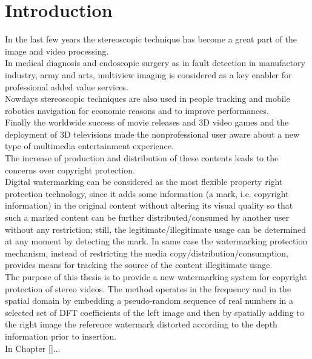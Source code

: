 \chapter*{Introduction}
\label{intro}
{}

In the last few years the stereoscopic technique has become a great part of the image and video processing.\\
In medical diagnosis and endoscopic surgery as in fault detection in manufactory industry, army and arts,
multiview imaging is considered as a key enabler  for professional added value services.\\
Nowdays stereoscopic techniques are also used in people tracking and mobile robotics
navigation for economic reasons and to improve performances.\\
Finally the worldwide success of movie releases and  3D video games and the deployment of 3D televisions made the nonprofessional user aware about a new type of multimedia entertainment experience.\\
The increase of production and distribution of these contents leads to the concerns over copyright protection.\\
Digital watermarking can be considered as the most flexible property right protection technology, since it adds some information (a mark, i.e. copyright information) in the
original content without altering its visual quality so that such a marked content can be further distributed/consumed by another user without any restriction; still, the legitimate/illegitimate usage can be determined at any moment by detecting the mark. In same case the watermarking protection mechanism, instead of restricting the media copy/distribution/consumption, provides means for tracking the source of the content illegitimate usage.\\
The purpose of this thesis is to provide a new watermarking system for copyright protection of stereo videos. The method operates in the frequency and in the spatial domain by embedding a pseudo-random sequence of real numbers in a selected set of DFT coefficients of the left image and then by spatially adding to the right image the reference watermark distorted according to the depth information prior to insertion.\\
In Chapter \ref{}...